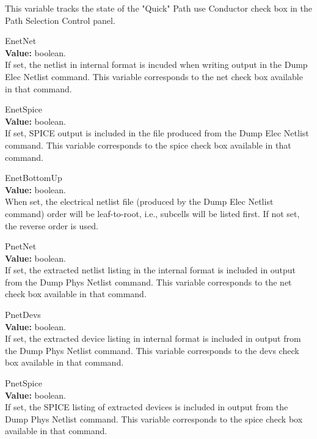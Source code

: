 \begin{description}
This variable tracks the state of the {\cb "Quick" Path use Conductor}
check box in the {\cb Path Selection Control} panel.

\item{\et EnetNet}\\
{\bf Value:} boolean.\\
If set, the netlist in internal format is incuded when writing output
in the {\cb Dump Elec Netlist} command.  This variable corresponds to
the {\et net} check box available in that command.

\item{\et EnetSpice}\\
{\bf Value:} boolean.\\
If set, SPICE output is included in the file produced from the {\cb
Dump Elec Netlist} command.  This variable corresponds to the {\et
spice} check box available in that command.

\item{\et EnetBottomUp}\\
{\bf Value:} boolean.\\
When set, the electrical netlist file (produced by the {\cb Dump Elec
Netlist} command) order will be leaf-to-root, i.e., subcells will be
listed first.  If not set, the reverse order is used.

\item{\et PnetNet}\\
{\bf Value:} boolean.\\
If set, the extracted netlist listing in the internal format is
included in output from the {\cb Dump Phys Netlist} command.  This
variable corresponds to the {\et net} check box available in that
command.

\item{\et PnetDevs}\\
{\bf Value:} boolean.\\
If set, the extracted device listing in internal format is included in
output from the {\cb Dump Phys Netlist} command.  This variable
corresponds to the {\et devs} check box available in that command.

\item{\et PnetSpice}\\
{\bf Value:} boolean.\\
If set, the SPICE listing of extracted devices is included in output
from the {\cb Dump Phys Netlist} command.  This variable corresponds
to the {\et spice} check box available in that command.


\end{description}
